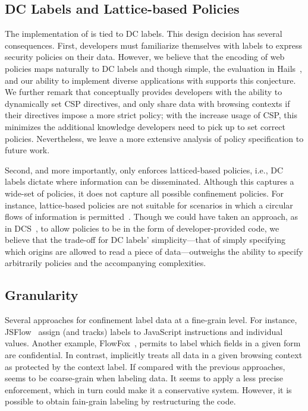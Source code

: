 
\subsection{DC Labels and Lattice-based Policies}

The implementation of \sys{} is tied to DC labels.
%
This design decision has several consequences.
%
First, developers must familiarize themselves with labels to express
security policies on their data.
%
However, we believe that the encoding of web policies maps naturally
to DC labels and though simple, the evaluation in
Hails~, and our ability to implement diverse
applications with \sys{} supports this conjecture.
%
We further remark that \sys{} conceptually provides developers with
the ability to dynamically set CSP directives, and only share data
with browsing contexts if their directives impose a more strict
policy; with the increase usage of CSP, this minimizes the additional
knowledge developers need to pick up to set correct policies.
%
Nevertheless, we leave a more extensive analysis of policy
specification to future work.
 
Second, and more importantly, \sys{} only enforces latticed-based
policies, i.e., DC labels dictate where information can be
disseminated.
%
Although this captures a wide-set of policies, it does not capture all
possible confinement policies.
%
For instance, lattice-based policies are not suitable for scenarios in
which a circular flows of information is permitted~\cite{Badger:1995}.
%
Though we could have taken an approach, as in DCS~\cite{Akhawe2013},
to allow policies to be in the form of developer-provided code, we
believe that the trade-off for DC labels' simplicity---that of simply
specifying which origins are allowed to read a piece of
data---outweighs the ability to specify arbitrarily policies and the
accompanying complexities.


\subsection{Granularity} 

Several approaches for confinement label data at a fine-grain level. For
instance, JSFlow~\cite{Hedin:2012}\tocite{} assign (and tracks) labels to
JavaScript instructions and individual values. Another example,
FlowFox~\cite{DeGroef:2012}, permits to label which fields in a given form are
confidential. In contrast, \sys{} implicitly treats all data in a given browsing
context as protected by the context label.  If compared with the previous
approaches, \sys{} seems to be coarse-grain when labeling data.  It seems to
apply a less precise enforcement, which in turn could make it a conservative
system. However, it is possible to obtain fain-grain labeling by restructuring
the code.

